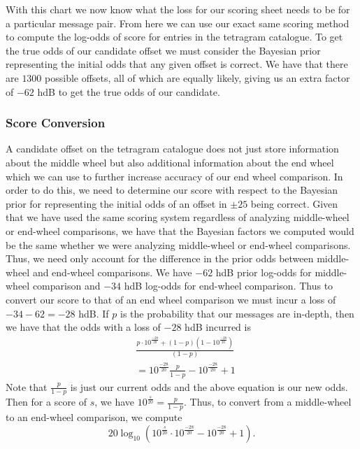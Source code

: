 \noindent With this chart we now know what the loss for our scoring
sheet needs to be for a particular message pair. From here we can
use our exact same scoring method to compute the log-odds of score
for entries in the tetragram catalogue. To get the true odds of our
candidate offset we must consider the Bayesian prior representing
the initial odds that any given offset is correct. We have that
there are $1300$ possible offsets, all of which are equally likely,
giving us an extra factor of $-62$ hdB to get the true odds of our candidate.
\subsubsection{Score Conversion} A candidate offset on the
tetragram catalogue does not just store information about the
middle wheel but also additional information about the end wheel
which we can use to further increase accuracy of our end wheel
comparison. In order to do this, we need to determine our score
with respect to the Bayesian prior for representing the initial
odds of an offset in $\pm25$ being correct. Given that we have used
the same scoring system regardless of analyzing middle-wheel or
end-wheel comparisons, we have that the Bayesian factors we
computed would be the same whether we were analyzing middle-wheel
or end-wheel comparisons. Thus, we need only account for the
difference in the prior odds between middle-wheel and end-wheel
comparisons. We have $-62$ hdB prior log-odds for middle-wheel
comparison and $-34$ hdB log-odds for end-wheel comparison. Thus to
convert our score to that of an end wheel comparison we must incur
a loss of $-34-62 = -28$ hdB. If $p$ is the probability that our
messages are in-depth, then we have that the odds with a loss of
$-28$ hdB incurred is
\begin{align*}
  & \frac{p\cdot10^{\frac{-28}{20}} + (1-p)(1-10^{\frac{-28}{20}})}{(1-p)} \\
  & = 10^{\frac{-28}{20}}\frac{p}{1-p}-10^{\frac{-28}{20}} + 1
\end{align*}
Note that $\frac{p}{1-p}$ is just our current odds and the above
equation is our new odds. Then for a score of $s$, we have
$10^\frac{s}{20} = \frac{p}{1-p}$. Thus, to convert from a
middle-wheel to an end-wheel comparison, we compute
\[
  20\log_{10}(10^\frac{s}{20}\cdot10^{\frac{-28}{20}}
  -10^{\frac{-28}{20}} + 1).
\]

